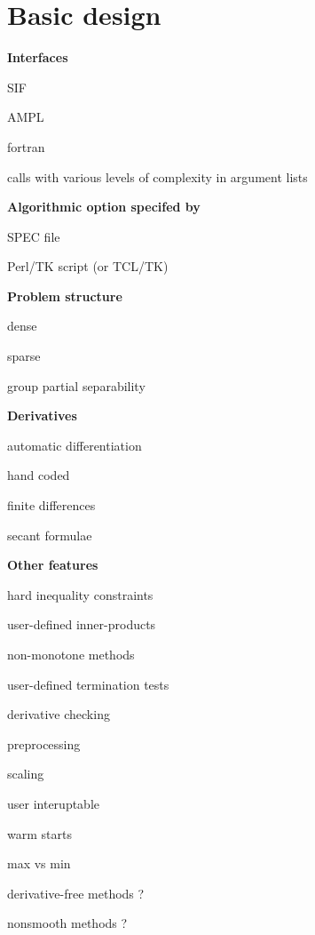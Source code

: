 \documentclass[twoside]{article}
\author{\paperauthor}
\title{\papertitle}
\newcommand{\alist}[2]{\begin{#1}{#2}\end{#1}}
\newcommand{\ilist}[1]{\alist{itemize}{#1}}
\newcommand{\header}[1]{\vspace{5mm}

\noindent
\textbf{\large {#1}}}
\begin{document}
\maketitle
\thispagestyle{empty}

\section{Basic design} 

\header{Interfaces}

\ilist{
\item SIF
\item AMPL
\item fortran
\item calls with various levels of complexity in argument lists
}

\header{Algorithmic option specifed by}

\ilist{
\item SPEC file
\item Perl/TK script (or TCL/TK)
}

\header{Problem structure}

\ilist{
\item dense
\item sparse
\item group partial separability
}

\header{Derivatives}

\ilist{
\item automatic differentiation
\item hand coded
\item finite differences
\item secant formulae
}

\header{Other features}

\ilist{
\item hard inequality constraints
\item user-defined inner-products
\item non-monotone methods
\item user-defined termination tests
\item derivative checking
\item preprocessing
\item scaling
\item user interuptable
\item warm starts
\item max vs min
\item derivative-free methods ?
\item nonsmooth methods ?
}
\end{document}
